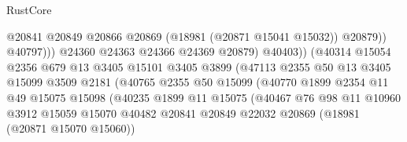 \begin{lexlean}{RustCore}
\begin{coremodule}
                                              @20841
                                              @20849
                                              @20866
                                              @20869
                                              (@18981 (@20871 @15041 @15032))
                                              @20879))
                                          @40797)))
                                    @24360
                                    @24363
                                    @24366
                                    @24369
                                    @20879)
                                  @40403))
                              (@40314
                                @15054
                                @2356
                                @679
                                @13
                                @3405
                                @15101
                                @3405
                                @3899
                                (@47113
                                  @2355
                                  @50
                                  @13
                                  @3405
                                  @15099
                                  @3509
                                  @2181
                                  (@40765
                                    @2355
                                    @50
                                    @15099
                                    (@40770
                                      @1899
                                      @2354
                                      @11
                                      @49
                                      @15075
                                      @15098
                                      (@40235
                                        @1899
                                        @11
                                        @15075
                                        (@40467
                                          @76
                                          @98
                                          @11
                                          @10960
                                          @3912
                                          @15059
                                          @15070
                                          @40482
                                          @20841
                                          @20849
                                          @22032
                                          @20869
                                          (@18981 (@20871 @15070 @15060))

\end{coremodule}
\end{lexlean}
